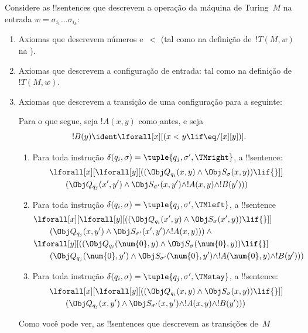 \documentclass[../../../include/open-logic-section]{subfiles}
\begin{document}
Considere as !!{sentence}s que descrevem a operação da máquina de
Turing~$M$ na entrada $w = \sigma_{i_1}\dots\sigma_{i_k}$:
\begin{enumerate}
\item Axiomas que descrevem números e~$<$ (tal como na definição
de~$!T(M,w)$ na ).
\item Axiomas que descrevem a configuração de entrada: tal como na
definição de~$!T(M,w)$.
\item Axiomas que descrevem a transição de uma configuração para a
  seguinte:

Para o que segue, seja $!A(x, y)$ como antes, e seja
\[
  !B(y) \ident \lforall[x][(x < y \lif \eq/[x][y])].
\]
\begin{enumerate}
\item {} Para toda instrução $\delta(q_i, \sigma) =
  \tuple{q_j, \sigma', \TMright}$, a !!{sentence}:
\begin{align*}
& \lforall[x][\lforall[y][(
   (\Obj Q_{q_i}(x, y) \land \Obj S_{\sigma}(x, y)) \lif {}]] \\
&\qquad   (\Obj Q_{q_j}(x', y') \land \Obj S_{\sigma'}(x, y') \land
!A(x, y) \land !B(y')))
\end{align*}
\item {} Para toda instrução $\delta(q_i, \sigma) =
  \tuple{q_j, \sigma', \TMleft}$, a !!{sentence}
\begin{align*}
& \lforall[x][\lforall[y][
    ((\Obj Q_{q_i}(x', y) \land \Obj S_{\sigma}(x', y)) \lif {}]]\\
& \qquad   (\Obj Q_{q_j}(x, y') \land \Obj S_{\sigma'}(x', y') \land
!A(x, y))) \land {}\\
& \lforall[y][((\Obj Q_{q_i}(\num{0}, y) \land \Obj S_{\sigma}(\num{0},
    y)) \lif {}]\\
& \qquad (\Obj Q_{q_j}(\num{0}, y') \land \Obj S_{\sigma'}(\num{0},
  y') \land !A(\num{0}, y) \land !B(y')))
\end{align*}
\item {} Para toda instrução $\delta(q_i, \sigma) =
  \tuple{q_j, \sigma', \TMstay}$, a !!{sentence}:
\begin{align*}
& \lforall[x][\lforall[y][(
   (\Obj Q_{q_i}(x, y) \land \Obj S_{\sigma}(x, y)) \lif {}]] \\
&\qquad (\Obj Q_{q_j}(x, y') \land \Obj S_{\sigma'}(x, y') \land
!A(x, y) \land !B(y')))
\end{align*}
\end{enumerate}
Como você pode ver, as !!{sentence}s que descrevem as transições de~$M$ 

\end{enumerate}
\end{document}
